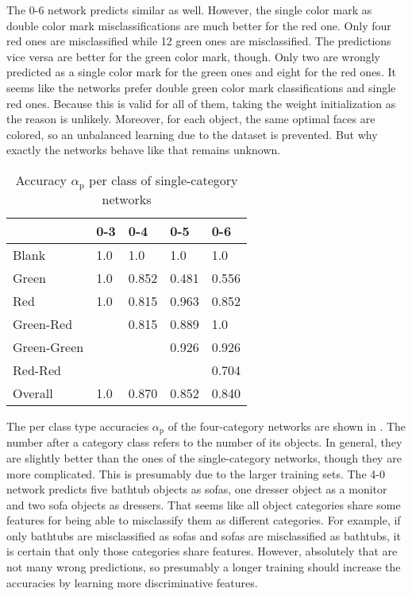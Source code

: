 The 0-6 network predicts similar as well.
However, the single color mark as double color mark misclassifications are much better for the red one.
Only four red ones are misclassified while 12 green ones are misclassified.
The predictions vice versa are better for the green color mark, though.
Only two are wrongly predicted as a single color mark for the green ones and eight for the red ones.
It seems like the networks prefer double green color mark classifications and single red ones.
Because this is valid for all of them, taking the weight initialization as the reason is unlikely.
Moreover, for each object, the same optimal faces are colored, so an unbalanced learning due to the dataset is prevented.
But why exactly the networks behave like that remains unknown. 
\begin{table}[]
	\centering
	\caption{Accuracy $\alpha_{\text{p}}$ per class of single-category networks}
	\label{tab:single-category-accuracies}
	\begin{tabular}{l|llll}
		            & 0-3 & 0-4   & 0-5   & 0-6   \\ \hline
		Blank       & 1.0 & 1.0   & 1.0   & 1.0   \\
		Green       & 1.0 & 0.852 & 0.481 & 0.556 \\
		Red         & 1.0 & 0.815 & 0.963 & 0.852 \\
		Green-Red   &     & 0.815 & 0.889 & 1.0   \\
		Green-Green &     &       & 0.926 & 0.926 \\
		Red-Red     &     &       &       & 0.704 \\ \hline
		Overall		& 1.0 & 0.870 & 0.852 & 0.840 \\
	\end{tabular}
\end{table}

The per class type accuracies $\alpha_{\text{p}}$ of the four-category networks are shown in .
The number after a category class refers to the number of its objects.
In general, they are slightly better than the ones of the single-category networks, though they are more complicated.
This is presumably due to the larger training sets.
The 4-0 network predicts five bathtub objects as sofas, one dresser object as a monitor and two sofa objects as dressers.
That seems like all object categories share some features for being able to misclassify them as different categories.
For example, if only bathtubs are misclassified as sofas and sofas are misclassified as bathtubs, it is certain that only those categories share features.
However, absolutely that are not many wrong predictions, so presumably a longer training should increase the accuracies by learning more discriminative features.

